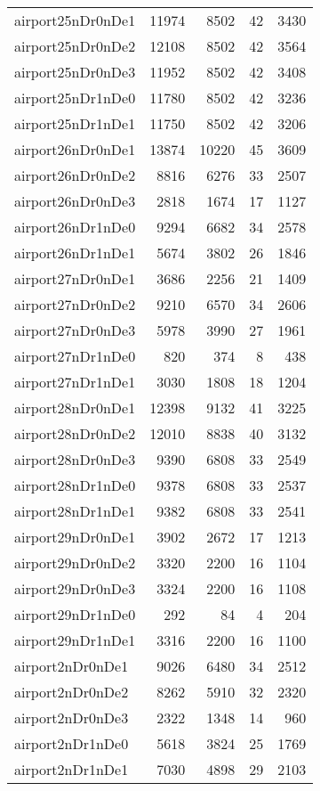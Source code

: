 \begin{longtable}{lrrrr}
airport25nDr0nDe1 & 11974 & 8502 & 42 & 3430 \\
airport25nDr0nDe2 & 12108 & 8502 & 42 & 3564 \\
airport25nDr0nDe3 & 11952 & 8502 & 42 & 3408 \\
airport25nDr1nDe0 & 11780 & 8502 & 42 & 3236 \\
airport25nDr1nDe1 & 11750 & 8502 & 42 & 3206 \\
airport26nDr0nDe1 & 13874 & 10220 & 45 & 3609 \\
airport26nDr0nDe2 & 8816 & 6276 & 33 & 2507 \\
airport26nDr0nDe3 & 2818 & 1674 & 17 & 1127 \\
airport26nDr1nDe0 & 9294 & 6682 & 34 & 2578 \\
airport26nDr1nDe1 & 5674 & 3802 & 26 & 1846 \\
airport27nDr0nDe1 & 3686 & 2256 & 21 & 1409 \\
airport27nDr0nDe2 & 9210 & 6570 & 34 & 2606 \\
airport27nDr0nDe3 & 5978 & 3990 & 27 & 1961 \\
airport27nDr1nDe0 & 820 & 374 & 8 & 438 \\
airport27nDr1nDe1 & 3030 & 1808 & 18 & 1204 \\
airport28nDr0nDe1 & 12398 & 9132 & 41 & 3225 \\
airport28nDr0nDe2 & 12010 & 8838 & 40 & 3132 \\
airport28nDr0nDe3 & 9390 & 6808 & 33 & 2549 \\
airport28nDr1nDe0 & 9378 & 6808 & 33 & 2537 \\
airport28nDr1nDe1 & 9382 & 6808 & 33 & 2541 \\
airport29nDr0nDe1 & 3902 & 2672 & 17 & 1213 \\
airport29nDr0nDe2 & 3320 & 2200 & 16 & 1104 \\
airport29nDr0nDe3 & 3324 & 2200 & 16 & 1108 \\
airport29nDr1nDe0 & 292 & 84 & 4 & 204 \\
airport29nDr1nDe1 & 3316 & 2200 & 16 & 1100 \\
airport2nDr0nDe1 & 9026 & 6480 & 34 & 2512 \\
airport2nDr0nDe2 & 8262 & 5910 & 32 & 2320 \\
airport2nDr0nDe3 & 2322 & 1348 & 14 & 960 \\
airport2nDr1nDe0 & 5618 & 3824 & 25 & 1769 \\
airport2nDr1nDe1 & 7030 & 4898 & 29 & 2103 \\

\end{longtable}
